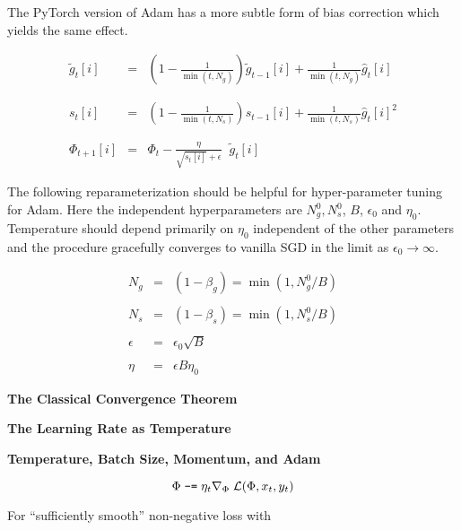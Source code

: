 {\vfill
The PyTorch version of Adam has a more subtle form of bias correction which yields the same effect.


\begin{eqnarray*}
  \tilde{g}_{t}[i] & = & \left(1-\frac{1}{\min(t,N_g)}\right)\tilde{g}_{t-1}[i] + \frac{1}{\min(t,N_g)} \hat{g}_t[i] \\
  \\
  \\
  s_{t}[i] & = & \left(1-\frac{1}{\min(t,N_s)}\right)s_{t-1}[i] + \frac{1}{\min(t,N_s)} \hat{g}_t[i]^2 \\
  \\
  \\
\Phi_{t+1}[i] & =  & \Phi_t - \frac{\eta}{\sqrt{s_{t}[i]} + \epsilon}\;\;\tilde{g}_{t}[i]
\end{eqnarray*}


{\huge
The following reparameterization should be helpful for hyper-parameter tuning for Adam.  Here the independent
hyperparameters are $N^0_g, N^0_s$, $B$, $\epsilon_0$ and $\eta_0$.  Temperature should depend primarily on $\eta_0$ independent of
the other parameters and the procedure gracefully converges to vanilla SGD in the limit as $\epsilon_0 \rightarrow \infty$.

\begin{eqnarray*}
N_g & = & (1-\beta_g) = \min(1,N^0_g/B) \\
\\
N_s & = & (1-\beta_s) = \min(1,N^0_s/B) \\
\\
\epsilon & = & \epsilon_0\sqrt{B} \\
\\
\eta & = & \epsilon B \eta_0
\end{eqnarray*}
}

  \centerline{\bf The Classical Convergence Theorem}
  \vfill
  \centerline{\bf The Learning Rate as Temperature}
  \vfill
  \centerline{\bf Temperature, Batch Size, Momentum, and Adam}


} 



$$\Phi \;\mbox{\tt -=} \; \eta_t \nabla_\Phi\;{\cal L}(\Phi,x_t,y_t)$$

\vfill
For ``sufficiently smooth'' non-negative loss with


